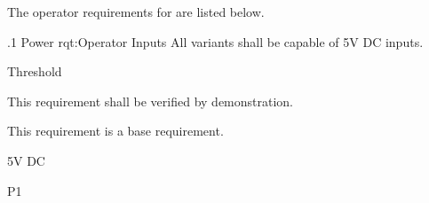 The operator requirements for \ThisSystem are listed below.

\ONERQMTVKPP
{\RqtNumberBase.1}
{Power}
{rqt:Operator Inputs}
{All \ThisSys variants shall be capable of 5V DC inputs.}
{
	\item [Phase 1] Threshold
}
{This requirement shall be verified by demonstration.}
{
	\item [N/A] This requirement is a base requirement.
}
{
  \item 5V DC 
}
{P1}

